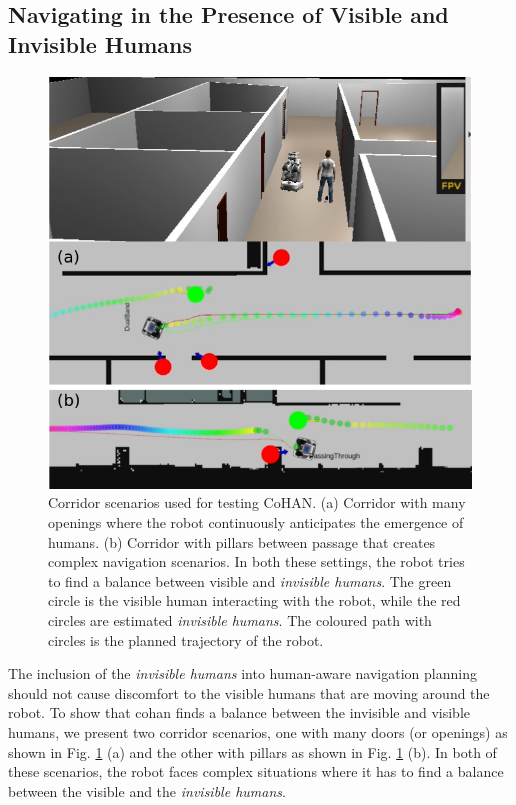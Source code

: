 \subsection{Navigating in the Presence of Visible and Invisible Humans}
\begin{figure}[h!]
    \centering
\includegraphics[width=0.8\columnwidth]{images/chapter5/corridors_new}
    \caption{Corridor scenarios used for testing CoHAN. (a) Corridor with many openings where the robot continuously anticipates the emergence of humans. (b) Corridor with pillars between passage that creates complex navigation scenarios. In both these settings, the robot tries to find a balance between visible and \textit{invisible humans}. The green circle is the visible human interacting with the robot, while the red circles are estimated \textit{invisible humans}. The coloured path with circles is the planned trajectory of the robot.}
        \label{fig:corridor_scene}
\end{figure}
\noindent The inclusion of the \textit{invisible humans} into human-aware navigation planning should not cause discomfort to the visible humans that are moving around the robot. To show that \acrshort{cohan} finds a balance between the invisible and visible humans, we present two corridor scenarios, one with many doors (or openings) as shown in Fig. \ref{fig:corridor_scene} (a) and the other with pillars as shown in Fig. \ref{fig:corridor_scene} (b). In both of these scenarios, the robot faces complex situations where it has to find a balance between the visible and the \textit{invisible humans}.

